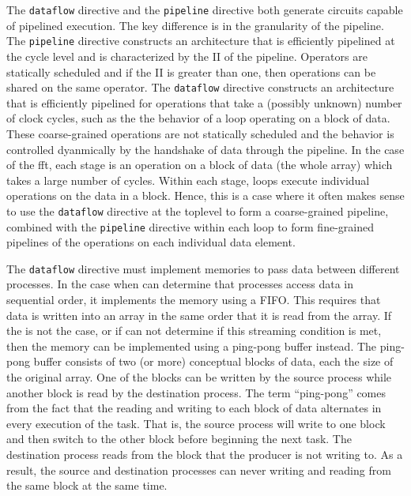 The \lstinline{dataflow} directive and the \lstinline{pipeline} directive both generate circuits capable of pipelined execution.  The key difference is in the granularity of the pipeline. The \lstinline{pipeline} directive constructs an architecture that is efficiently pipelined at the cycle level and is characterized by the II of the pipeline.  Operators are statically scheduled and if the II is greater than one, then operations can be shared on the same operator.  The \lstinline{dataflow} directive constructs an architecture that is efficiently pipelined for operations that take a (possibly unknown) number of clock cycles, such as the the behavior of a loop operating on a block of data.  These coarse-grained operations are not statically scheduled and the behavior is controlled dyanmically by the handshake of data through the pipeline.  In the case of the \gls{fft}, each stage is an operation on a block of data (the whole array) which takes a large number of cycles.  Within each stage, loops execute individual operations on the data in a block.  Hence, this is a case where it often makes sense to use the \lstinline|dataflow| directive at the toplevel to form a coarse-grained pipeline, combined with the \lstinline|pipeline| directive within each loop to form fine-grained pipelines of the operations on each individual data element.

The \lstinline{dataflow} directive must implement memories to pass data between different processes. In the case when \VHLS can determine that processes access data in sequential order, it implements the memory using a FIFO. This requires that data is written into an array in the same order that it is read from the array.  If the is not the case, or if \VHLS can not determine if this streaming condition is met, then the memory can be implemented using a ping-pong buffer instead.   The ping-pong buffer consists of two (or more) conceptual blocks of data, each the size of the original array. One of the blocks can be written by the source process while another block is read by the destination process. The term ``ping-pong'' comes from the fact that the reading and writing to each block of data alternates in every execution of the task. That is, the source process will write to one block and then switch to the other block before beginning the next task. The destination process reads from the block that the producer is not writing to. As a result, the source and destination processes can never writing and reading from the same block at the same time. 

